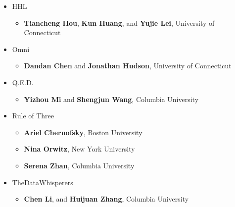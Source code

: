 \begin{itemize}
\item HHL
  \begin{itemize}
  \item
    \textbf{Tiancheng Hou},
    \textbf{Kun Huang}, and
    \textbf{Yujie Lei}, University of Connecticut
  \end{itemize}
\item Omni
  \begin{itemize}
  \item \textbf{Dandan Chen} and
    \textbf{Jonathan Hudson}, University of Connecticut
  \end{itemize}
\item Q.E.D.
  \begin{itemize}
  \item \textbf{Yizhou Mi} and
    \textbf{Shengjun Wang}, Columbia University
  \end{itemize}
\item Rule of Three
  \begin{itemize}
  \item \textbf{Ariel Chernofsky}, Boston University
  \item \textbf{Nina Orwitz}, New York University
  \item \textbf{Serena Zhan}, Columbia University 
  \end{itemize}
\item TheDataWhisperers
  \begin{itemize}
  \item \textbf{Chen Li},
    and
    \textbf{Huijuan Zhang}, Columbia University
  \end{itemize}
\end{itemize}

